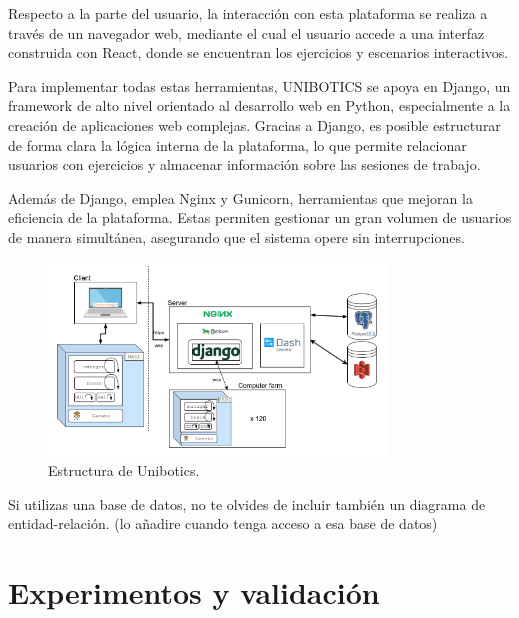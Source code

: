 \documentclass[a4paper, 12pt]{book}
\begin{document}
Respecto a la parte del usuario, la interacción con esta plataforma se realiza a través de un navegador web, mediante el cual el usuario accede a una interfaz construida con React, donde se encuentran los ejercicios y escenarios interactivos.

Para implementar todas estas herramientas, UNIBOTICS se apoya en Django, un framework de alto nivel orientado al desarrollo web en Python, especialmente a la creación de aplicaciones web complejas. Gracias a Django, es posible estructurar de forma clara la lógica interna de la plataforma, lo que permite relacionar usuarios con ejercicios y almacenar información sobre las sesiones de trabajo.

Además de Django, emplea Nginx y Gunicorn, herramientas que mejoran la eficiencia de la plataforma. Estas permiten gestionar un gran volumen de usuarios de manera simultánea, asegurando que el sistema opere sin interrupciones.

\begin{figure}
  \centering
  \includegraphics[width=9cm, keepaspectratio]{img/arquitectura.png}
  \caption{Estructura de Unibotics.}\label{fig:arquitectura}
\end{figure}

Si utilizas una base de datos, no te olvides de incluir también un diagrama de entidad-relación.
(lo añadire cuando tenga acceso a esa base de datos)

\cleardoublepage



\chapter{Experimentos y validación}
\label{chap:experimentos}
\end{document}
